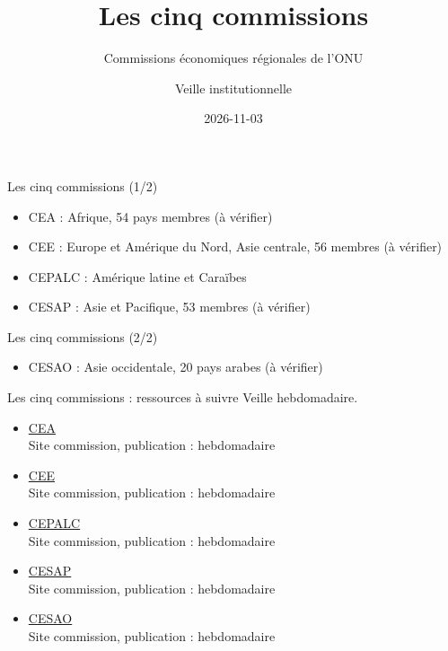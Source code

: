 \documentclass[aspectratio=169,11pt]{beamer}
\title{Les cinq commissions}
\subtitle{Commissions économiques régionales de l'ONU}
\author{Veille institutionnelle}
\date{2026-11-03}
\begin{document}
\begin{frame}\titlepage\end{frame}

\begin{frame}{Les cinq commissions (1/2)}
\begin{itemize}
\item CEA : Afrique, 54 pays membres (à vérifier)
\item CEE : Europe et Amérique du Nord, Asie centrale, 56 membres (à vérifier)
\item CEPALC : Amérique latine et Caraïbes
\item CESAP : Asie et Pacifique, 53 membres (à vérifier)
\end{itemize}
\end{frame}

\begin{frame}{Les cinq commissions (2/2)}
\begin{itemize}
\item CESAO : Asie occidentale, 20 pays arabes (à vérifier)
\end{itemize}
\end{frame}

\begin{frame}{Les cinq commissions : ressources à suivre}
\small
Veille hebdomadaire.
\begin{itemize}
\item \href{https://www.uneca.org}{CEA}\\{\footnotesize Site commission, publication : hebdomadaire}
\item \href{https://unece.org}{CEE}\\{\footnotesize Site commission, publication : hebdomadaire}
\item \href{https://www.cepal.org}{CEPALC}\\{\footnotesize Site commission, publication : hebdomadaire}
\item \href{https://www.unescap.org}{CESAP}\\{\footnotesize Site commission, publication : hebdomadaire}
\item \href{https://www.unescwa.org}{CESAO}\\{\footnotesize Site commission, publication : hebdomadaire}
\end{itemize}
\end{frame}
\end{document}
